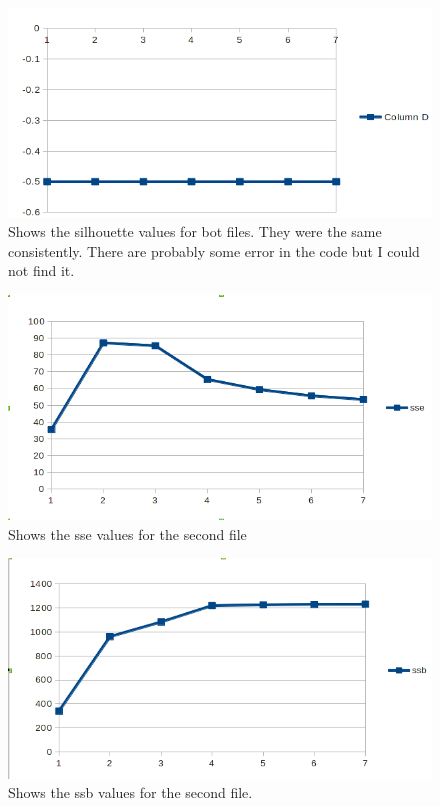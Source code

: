 \documentclass[12pt, a4paper]{article}
\begin{document}
\begin{figure}[htb]
    \centering
    \includegraphics[width=\textwidth]{silhouette1}
    \caption{Shows the silhouette values for bot files. They were the same
consistently. There are probably some error in the code but I could not find
it.}
    \label{fig:5}
\end{figure}

\begin{figure}[htb]
    \centering
    \includegraphics[width=\textwidth]{sse2}
    \caption{Shows the sse values for the second file}
    \label{fig:6}
\end{figure}

\begin{figure}[htb]
    \centering
    \includegraphics[width=\textwidth]{ssb2}
    \caption{Shows the ssb values for the second file.}
    \label{fig:7}
\end{figure}
\end{document}
